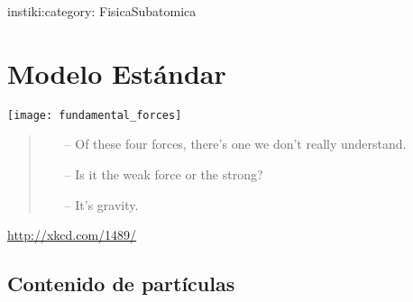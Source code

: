 instiki:category: FisicaSubatomica
\chapter{Modelo Estándar}
\label{cha:modelo-estandar} %

\texttt{[image: fundamental\_forces]}

\begin{quote}
  \begin{itemize}
  \item[--]  Of these four forces, there's one we don't really understand.
  \item[--] Is it the weak force or the strong?
  \item[--]It's gravity.
  \end{itemize}
\end{quote}
\url{http://xkcd.com/1489/}

\section{Contenido de partículas}

